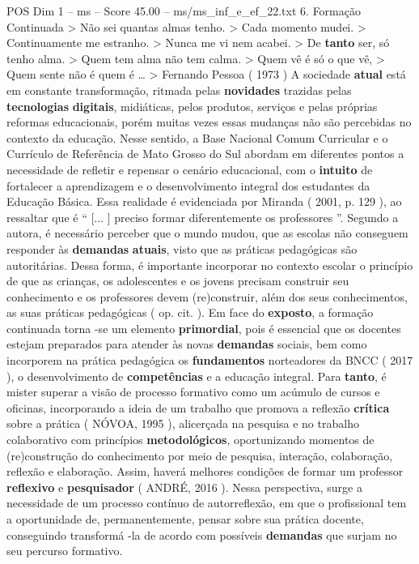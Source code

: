 \begin{textsample}{POS Dim 1 – ms – Score 45.00 – ms/ms\_inf\_e\_ef\_22.txt}  \label{ex:f1_pos_187}
6.
Formação Continuada > Não sei quantas almas tenho. > Cada momento mudei. > Continuamente me estranho. > Nunca me vi nem acabei. > De \textbf{tanto} ser, só tenho alma. > Quem tem alma não tem calma. > Quem vê é só o que vê, > Quem sente não é quem é … > Fernando Pessoa ( 1973 ) A sociedade \textbf{atual} está em constante transformação, ritmada pelas \textbf{novidades} trazidas pelas \textbf{tecnologias} \textbf{digitais}, midiáticas, pelos produtos, serviços e pelas próprias reformas educacionais, porém muitas vezes essas mudanças não são percebidas no contexto da educação.
Nesse sentido, a Base Nacional Comum Curricular e o Currículo de Referência de Mato Grosso do Sul abordam em diferentes pontos a necessidade de refletir e repensar o cenário educacional, com o \textbf{intuito} de fortalecer a aprendizagem e o desenvolvimento integral dos estudantes da Educação Básica.
Essa realidade é evidenciada por Miranda ( 2001, p. 129 ), ao ressaltar que é “ [... ] preciso formar diferentemente os professores ”.
Segundo a autora, é necessário perceber que o mundo mudou, que as escolas não conseguem responder às \textbf{demandas} \textbf{atuais}, visto que as práticas pedagógicas são autoritárias.
Dessa forma, é importante incorporar no contexto escolar o princípio de que as crianças, os adolescentes e os jovens precisam construir seu conhecimento e os professores devem (re)construir, além dos seus conhecimentos, as suas práticas pedagógicas ( op. cit. ).
Em face do \textbf{exposto}, a formação continuada torna -se um elemento \textbf{primordial}, pois é essencial que os docentes estejam preparados para atender às novas \textbf{demandas} sociais, bem como incorporem na prática pedagógica os \textbf{fundamentos} norteadores da BNCC ( 2017 ), o desenvolvimento de \textbf{competências} e a educação integral.
Para \textbf{tanto}, é mister superar a visão de processo formativo como um acúmulo de cursos e oficinas, incorporando a ideia de um trabalho que promova a reflexão \textbf{crítica} sobre a prática ( NÓVOA, 1995 ), alicerçada na pesquisa e no trabalho colaborativo com princípios \textbf{metodológicos}, oportunizando momentos de (re)construção do conhecimento por meio de pesquisa, interação, colaboração, reflexão e elaboração.
Assim, haverá melhores condições de formar um professor \textbf{reflexivo} e \textbf{pesquisador} ( ANDRÉ, 2016 ).
Nessa perspectiva, surge a necessidade de um processo contínuo de autorreflexão, em que o profissional tem a oportunidade de, permanentemente, pensar sobre sua prática docente, conseguindo transformá -la de acordo com possíveis \textbf{demandas} que surjam no seu percurso formativo.

\end{textsample}
